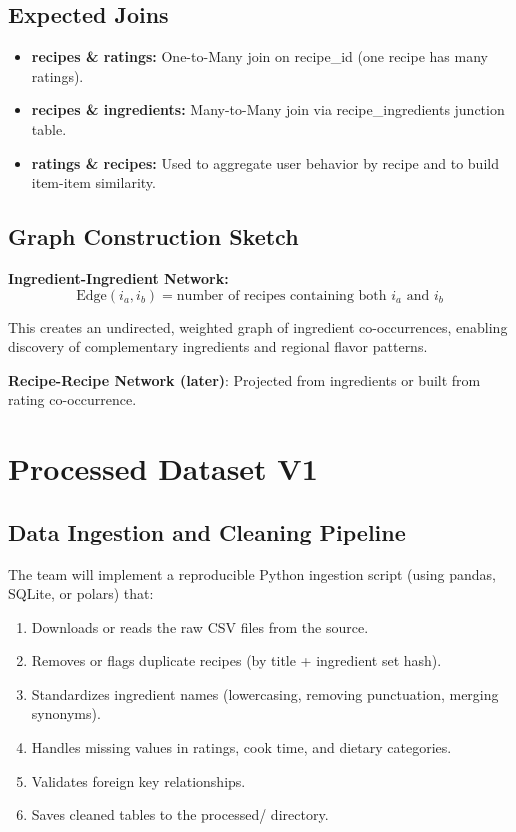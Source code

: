 \documentclass[11pt,a4paper]{article}
\begin{document}
\subsection{Expected Joins}

\begin{itemize}
    \item \textbf{recipes \& ratings:} One-to-Many join on recipe\_id (one recipe has many ratings).
    \item \textbf{recipes \& ingredients:} Many-to-Many join via recipe\_ingredients junction table.
    \item \textbf{ratings \& recipes:} Used to aggregate user behavior by recipe and to build item-item similarity.
\end{itemize}

\subsection{Graph Construction Sketch}

\textbf{Ingredient-Ingredient Network:} 
\begin{equation}
\text{Edge}(i_a, i_b) = \text{number of recipes containing both } i_a \text{ and } i_b
\end{equation}

This creates an undirected, weighted graph of ingredient co-occurrences, enabling discovery of complementary ingredients and regional flavor patterns.

\textbf{Recipe-Recipe Network (later)}: Projected from ingredients or built from rating co-occurrence.

\newpage

\section{Processed Dataset V1}

\subsection{Data Ingestion and Cleaning Pipeline}

The team will implement a reproducible Python ingestion script (using pandas, SQLite, or polars) that:

\begin{enumerate}
    \item Downloads or reads the raw CSV files from the source.
    \item Removes or flags duplicate recipes (by title + ingredient set hash).
    \item Standardizes ingredient names (lowercasing, removing punctuation, merging synonyms).
    \item Handles missing values in ratings, cook time, and dietary categories.
    \item Validates foreign key relationships.
    \item Saves cleaned tables to the processed/ directory.
\end{enumerate}
\end{document}
